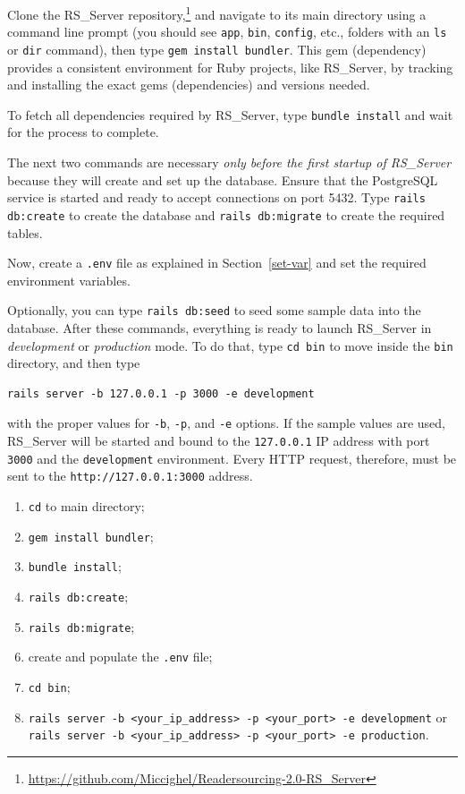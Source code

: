 \documentclass[a4paper, english]{article}
\newcounter{subsubsubsection}[subsubsection]
\newcommand{\rsserver}{RS\_Server\xspace}
\begin{document}

Clone the \rsserver repository,\footnote{\url{https://github.com/Miccighel/Readersourcing-2.0-RS_Server}} and navigate to its main directory using a command line prompt (you should see \verb|app|, \verb|bin|, \verb|config|, etc., folders with an \verb|ls| or \verb|dir| command), then type \verb|gem install bundler|. This gem (dependency) provides a consistent environment for Ruby projects, like \rsserver, by tracking and installing the exact gems (dependencies) and versions needed.

To fetch all dependencies required by \rsserver, type \verb|bundle install| and wait for the process to complete.

The next two commands are necessary \emph{only before the first startup of \rsserver} because they will create and set up the database. Ensure that the PostgreSQL service is started and ready to accept connections on port 5432. Type \verb|rails db:create| to create the database and \verb|rails db:migrate| to create the required tables.

Now, create a \verb|.env| file as explained in Section~\ref{set-var} and set the required environment variables.

Optionally, you can type \verb|rails db:seed| to seed some sample data into the database. After these commands, everything is ready to launch \rsserver in \emph{development} or \emph{production} mode. To do that, type \verb|cd bin| to move inside the \verb|bin| directory, and then type
\begin{verbatim}
rails server -b 127.0.0.1 -p 3000 -e development
\end{verbatim}
with the proper values for \verb|-b|, \verb|-p|, and \verb|-e| options. If the sample values are used, \rsserver will be started and bound to the \verb|127.0.0.1| IP address with port \verb|3000| and the \verb|development| environment. Every HTTP request, therefore, must be sent to the \verb|http://127.0.0.1:3000| address.


\begin{enumerate}
\item \verb|cd| to main directory;
\item \verb|gem install bundler|;
\item \verb|bundle install|;
\item \verb|rails db:create|;
\item \verb|rails db:migrate|;
\item create and populate the \verb|.env| file;
\item \verb|cd bin|;
\item \verb|rails server -b <your_ip_address> -p <your_port> -e development| or\\ \verb|rails server -b <your_ip_address> -p <your_port> -e production|.
\end{enumerate}
\end{document}
